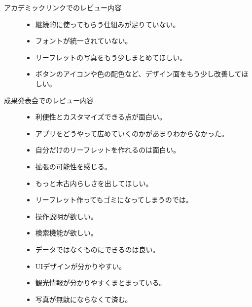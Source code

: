 \begin{description}
\item[アカデミックリンクでのレビュー内容]\mbox{}
 \begin{itemize}
 \item 継続的に使ってもらう仕組みが足りていない。
 \item フォントが統一されていない。
 \item リーフレットの写真をもう少しまとめてほしい。
 \item ボタンのアイコンや色の配色など、デザイン面をもう少し改善してほしい。
 \end{itemize}
\item[成果発表会でのレビュー内容]\mbox{}
 \begin{itemize}
 \item 利便性とカスタマイズできる点が面白い。
 \item アプリをどうやって広めていくのかがあまりわからなかった。
 \item 自分だけのリーフレットを作れるのは面白い。
 \item 拡張の可能性を感じる。
 \item もっと木古内らしさを出してほしい。
 \item リーフレット作ってもゴミになってしまうのでは。
 \item 操作説明が欲しい。
 \item 検索機能が欲しい。
 \item データではなくものにできるのは良い。
 \item UIデザインが分かりやすい。
 \item 観光情報が分かりやすくまとまっている。
 \item 写真が無駄にならなくて済む。
 \end{itemize}
\end{description}

